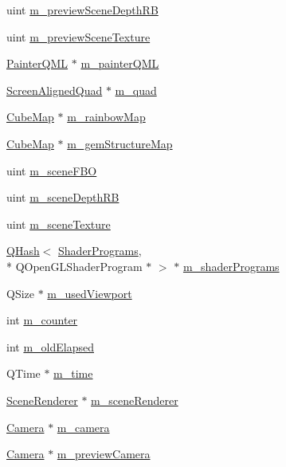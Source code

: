\begin{DoxyCompactItemize}
uint \hyperlink{class_painter_ad4fb3338a366abb5592996572afa070d}{m\+\_\+preview\+Scene\+Depth\+R\+B}
\item 
uint \hyperlink{class_painter_aff56d277a464801c66a7f7414ef86733}{m\+\_\+preview\+Scene\+Texture}
\item 
\hyperlink{class_painter_q_m_l}{Painter\+Q\+M\+L} $\ast$ \hyperlink{class_painter_af2774293bfaf6f654cb01e504937abb8}{m\+\_\+painter\+Q\+M\+L}
\item 
\hyperlink{class_screen_aligned_quad}{Screen\+Aligned\+Quad} $\ast$ \hyperlink{class_painter_a50f7fad2d44554f0be878a96afacfa44}{m\+\_\+quad}
\item 
\hyperlink{class_cube_map}{Cube\+Map} $\ast$ \hyperlink{class_painter_a9f99a5ccb9b1b645281b1439cbf416e1}{m\+\_\+rainbow\+Map}
\item 
\hyperlink{class_cube_map}{Cube\+Map} $\ast$ \hyperlink{class_painter_abd540fa99df6acea8eb32c3bcfb81773}{m\+\_\+gem\+Structure\+Map}
\item 
uint \hyperlink{class_painter_a4df95c88604785d7eecaf1474df67629}{m\+\_\+scene\+F\+B\+O}
\item 
uint \hyperlink{class_painter_a92db0cde0f42dd82569e85785850c283}{m\+\_\+scene\+Depth\+R\+B}
\item 
uint \hyperlink{class_painter_af82c25060227ea6ec91ae60f0753c593}{m\+\_\+scene\+Texture}
\item 
\hyperlink{singleton_q_hash}{Q\+Hash}$<$ \hyperlink{shaderprograms_8h_ada89718f8d394b2cc093eb9770c554ff}{Shader\+Programs}, \\*
Q\+Open\+G\+L\+Shader\+Program $\ast$ $>$ $\ast$ \hyperlink{class_painter_a30655a30ba8f540f0e28b976b97d126f}{m\+\_\+shader\+Programs}
\item 
Q\+Size $\ast$ \hyperlink{class_painter_aff5d274eb90d7a94565effe5bd5d03f7}{m\+\_\+used\+Viewport}
\item 
int \hyperlink{class_painter_a1a3de21931e9796db399252b7336169c}{m\+\_\+counter}
\item 
int \hyperlink{class_painter_aedfda3eb1a37f4f121291c558786492a}{m\+\_\+old\+Elapsed}
\item 
Q\+Time $\ast$ \hyperlink{class_painter_ab6976ab19027866bbb01e9a1504aa5c9}{m\+\_\+time}
\item 
\hyperlink{class_scene_renderer}{Scene\+Renderer} $\ast$ \hyperlink{class_painter_a574ba64fd2af1d8c64d2c293d4811fc2}{m\+\_\+scene\+Renderer}
\item 
\hyperlink{class_camera}{Camera} $\ast$ \hyperlink{class_painter_a05558ea7a2f818641e0506d01d518010}{m\+\_\+camera}
\item 
\hyperlink{class_camera}{Camera} $\ast$ \hyperlink{class_painter_a237399ac0b5da625eb19de1ae3c0a236}{m\+\_\+preview\+Camera}
\end{DoxyCompactItemize}


